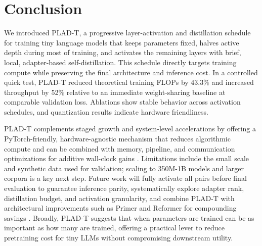 \documentclass{article}
\begin{document}
\section{Conclusion}
We introduced PLAD-T, a progressive layer-activation and distillation schedule for training tiny language models that keeps parameters fixed, halves active depth during most of training, and activates the remaining layers with brief, local, adapter-based self-distillation. This schedule directly targets training compute while preserving the final architecture and inference cost. In a controlled quick test, PLAD-T reduced theoretical training FLOPs by 43.3\% and increased throughput by 52\% relative to an immediate weight-sharing baseline at comparable validation loss. Ablations show stable behavior across activation schedules, and quantization results indicate hardware friendliness.

PLAD-T complements staged growth and system-level accelerations by offering a PyTorch-friendly, hardware-agnostic mechanism that reduces algorithmic compute and can be combined with memory, pipeline, and communication optimizations for additive wall-clock gains \cite{shen-2022-staged,andoorveedu-2022-tempo,narayanan-2020-memory,jia-2024-toward}. Limitations include the small scale and synthetic data used for validation; scaling to 350M-1B models and larger corpora is a key next step. Future work will fully activate all pairs before final evaluation to guarantee inference parity, systematically explore adapter rank, distillation budget, and activation granularity, and combine PLAD-T with architectural improvements such as Primer and Reformer for compounding savings \cite{so-2021-searching,kitaev-2020-reformer}. Broadly, PLAD-T suggests that when parameters are trained can be as important as how many are trained, offering a practical lever to reduce pretraining cost for tiny LLMs without compromising downstream utility.




\end{document}
